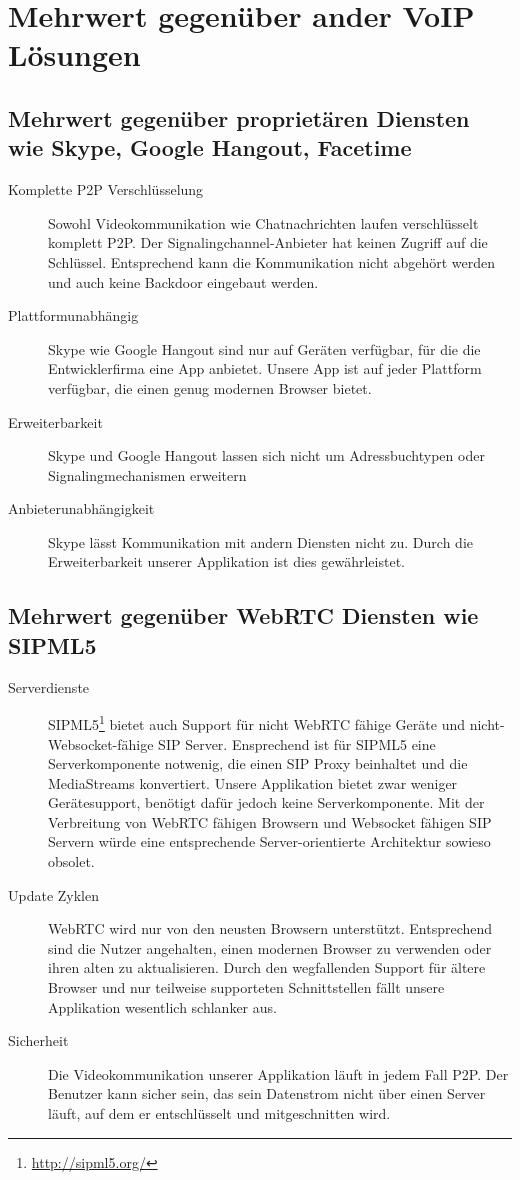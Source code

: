 		
	\section{Mehrwert gegenüber ander VoIP Lösungen}
		\subsection{Mehrwert gegenüber proprietären Diensten wie Skype, Google Hangout, Facetime}
			\begin{description}
				\item[Komplette P2P Verschlüsselung] Sowohl Videokommunikation wie Chatnachrichten laufen verschlüsselt komplett P2P. Der Signalingchannel-Anbieter hat keinen Zugriff auf die Schlüssel. Entsprechend kann die Kommunikation nicht abgehört werden und auch keine Backdoor eingebaut werden.
				\item[Plattformunabhängig] Skype wie Google Hangout sind nur auf Geräten verfügbar, für die die Entwicklerfirma eine App anbietet. Unsere App ist auf jeder Plattform verfügbar, die einen genug modernen Browser bietet.
				\item[Erweiterbarkeit] Skype und Google Hangout lassen sich nicht um Adressbuchtypen oder Signalingmechanismen erweitern
				\item[Anbieterunabhängigkeit] Skype lässt Kommunikation mit andern Diensten nicht zu. Durch die Erweiterbarkeit unserer Applikation ist dies gewährleistet.
			\end{description}
		\subsection{Mehrwert gegenüber WebRTC Diensten wie SIPML5}
			\begin{description}
				\item[Serverdienste] SIPML5\footnote{\hyperlink{http://sipml5.org/}{http://sipml5.org/}} bietet auch Support für nicht WebRTC fähige Geräte und nicht-Websocket-fähige SIP Server. Ensprechend ist für SIPML5 eine Serverkomponente notwenig, die einen SIP Proxy beinhaltet und die MediaStreams konvertiert. Unsere Applikation bietet zwar weniger Gerätesupport, benötigt dafür jedoch keine Serverkomponente. Mit der Verbreitung von WebRTC fähigen Browsern und Websocket fähigen SIP Servern würde eine entsprechende Server-orientierte Architektur sowieso obsolet.
				\item[Update Zyklen] WebRTC wird nur von den neusten Browsern unterstützt. Entsprechend sind die Nutzer angehalten, einen modernen Browser zu verwenden oder ihren alten zu aktualisieren. Durch den wegfallenden Support für ältere Browser und nur teilweise supporteten Schnittstellen fällt unsere Applikation wesentlich schlanker aus.
				\item[Sicherheit] Die Videokommunikation unserer Applikation läuft in jedem Fall P2P. Der Benutzer kann sicher sein, das sein Datenstrom nicht über einen Server läuft, auf dem er entschlüsselt und mitgeschnitten wird.
			\end{description}
